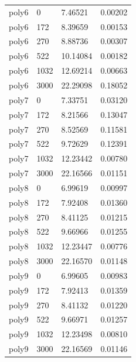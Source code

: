 \begin{longtable}{p{2.0cm} p{2.0cm} p{4.0cm} p{2.0cm}}
        \midrule
        poly6     & 0            & 7.46521          & 0.00202 \\
        poly6     & 172          & 8.39659          & 0.00153 \\
        poly6     & 270          & 8.88736          & 0.00307 \\
        poly6     & 522          & 10.14084         & 0.00182 \\
        poly6     & 1032         & 12.69214         & 0.00663 \\
        poly6     & 3000         & 22.29098         & 0.18052 \\
        \midrule
        poly7     & 0            & 7.33751          & 0.03120 \\
        poly7     & 172          & 8.21566          & 0.13047 \\
        poly7     & 270          & 8.52569          & 0.11581 \\
        poly7     & 522          & 9.72629          & 0.12391 \\
        poly7     & 1032         & 12.23442         & 0.00780 \\
        poly7     & 3000         & 22.16566         & 0.01151 \\
        \midrule
        poly8     & 0            & 6.99619          & 0.00997 \\
        poly8     & 172          & 7.92408          & 0.01360 \\
        poly8     & 270          & 8.41125          & 0.01215 \\
        poly8     & 522          & 9.66966          & 0.01255 \\
        poly8     & 1032         & 12.23447         & 0.00776 \\
        poly8     & 3000         & 22.16570         & 0.01148 \\
        \midrule
        poly9     & 0            & 6.99605          & 0.00983 \\
        poly9     & 172          & 7.92413          & 0.01359 \\
        poly9     & 270          & 8.41132          & 0.01220 \\
        poly9     & 522          & 9.66971          & 0.01257 \\
        poly9     & 1032         & 12.23498         & 0.00810 \\
        poly9     & 3000         & 22.16569         & 0.01146 \\
        \midrule

\end{longtable}
